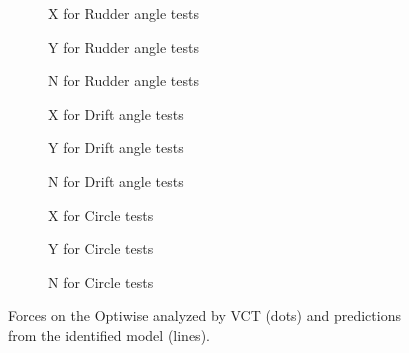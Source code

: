 \begin{figure}[h]
    \centering
    \begin{subfigure}[b]{0.325\textwidth}
         \centering
         
        \caption{X for Rudder angle tests}
        \label{fig:rudder_angle_X_optiwise}
    \end{subfigure}
    \hfill
    \begin{subfigure}[b]{0.325\textwidth}
        \centering
        
       \caption{Y for Rudder angle tests}
       \label{fig:rudder_angle_Y_optiwise}
    \end{subfigure}
    \hfill
    \begin{subfigure}[b]{0.325\textwidth}
        \centering
        
       \caption{N for Rudder angle tests}
       \label{fig:rudder_angle_N_optiwise}
    \end{subfigure}

    \vfill
    \begin{subfigure}[b]{0.325\textwidth}
        \centering
        
       \caption{X for Drift angle tests}
       \label{fig:drift_angle_X_optiwise}
    \end{subfigure}
    \hfill
    \begin{subfigure}[b]{0.325\textwidth}
        \centering
        
       \caption{Y for Drift angle tests}
       \label{fig:drift_angle_Y_optiwise}
    \end{subfigure}
    \hfill
    \begin{subfigure}[b]{0.325\textwidth}
        \centering
        
       \caption{N for Drift angle tests}
       \label{fig:drift_angle_N_optiwise}
    \end{subfigure}
    
    \vfill
    \begin{subfigure}[b]{0.325\textwidth}
        \centering
        
       \caption{X for Circle tests}
       \label{fig:circle_X_optiwise}
    \end{subfigure}
    \hfill
    \begin{subfigure}[b]{0.325\textwidth}
        \centering
        
       \caption{Y for Circle tests}
       \label{fig:circle_Y_optiwise}
    \end{subfigure}
    \hfill
    \begin{subfigure}[b]{0.325\textwidth}
        \centering
        
       \caption{N for Circle tests}
       \label{fig:circle_N_optiwise}
    \end{subfigure}
    
    \caption{Forces on the Optiwise analyzed by VCT (dots) and predictions from the identified model (lines).}
    \label{fig:VCT_optiwise}
\end{figure}

